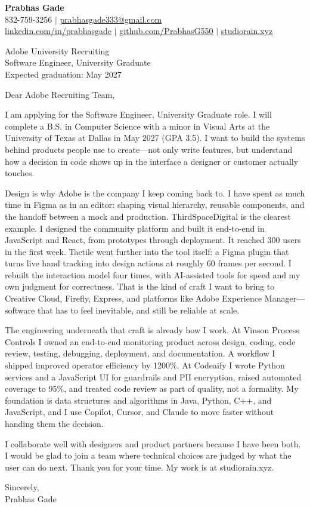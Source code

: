 \documentclass[letterpaper,11pt]{letter}
\begin{document}
\begin{flushleft}
\textbf{\large Prabhas Gade}\\
832-759-3256 $|$ \href{mailto:prabhasgade333@gmail.com}{prabhasgade333@gmail.com}\\
\href{https://linkedin.com/in/prabhasgade}{linkedin.com/in/prabhasgade} $|$
\href{https://github.com/PrabhasG550}{github.com/PrabhasG550} $|$
\href{https://studiorain.xyz}{studiorain.xyz}
\end{flushleft}

\vspace{6pt}
\begin{flushleft}
Adobe University Recruiting\\
Software Engineer, University Graduate\\
Expected graduation: May 2027
\end{flushleft}

Dear Adobe Recruiting Team,

I am applying for the Software Engineer, University Graduate role. I will complete a B.S. in Computer Science with a minor in Visual Arts at the University of Texas at Dallas in May 2027 (GPA 3.5). I want to build the systems behind products people use to create---not only write features, but understand how a decision in code shows up in the interface a designer or customer actually touches.

Design is why Adobe is the company I keep coming back to. I have spent as much time in Figma as in an editor: shaping visual hierarchy, reusable components, and the handoff between a mock and production. ThirdSpaceDigital is the clearest example. I designed the community platform and built it end-to-end in JavaScript and React, from prototypes through deployment. It reached 300 users in the first week. Tactile went further into the tool itself: a Figma plugin that turns live hand tracking into design actions at roughly 60 frames per second. I rebuilt the interaction model four times, with AI-assisted tools for speed and my own judgment for correctness. That is the kind of craft I want to bring to Creative Cloud, Firefly, Express, and platforms like Adobe Experience Manager---software that has to feel inevitable, and still be reliable at scale.

The engineering underneath that craft is already how I work. At Vinson Process Controls I owned an end-to-end monitoring product across design, coding, code review, testing, debugging, deployment, and documentation. A workflow I shipped improved operator efficiency by 1200\%. At Codeaify I wrote Python services and a JavaScript UI for guardrails and PII encryption, raised automated coverage to 95\%, and treated code review as part of quality, not a formality. My foundation is data structures and algorithms in Java, Python, C++, and JavaScript, and I use Copilot, Cursor, and Claude to move faster without handing them the decision.

I collaborate well with designers and product partners because I have been both. I would be glad to join a team where technical choices are judged by what the user can do next. Thank you for your time. My work is at studiorain.xyz.

Sincerely,\\
Prabhas Gade
\end{document}
